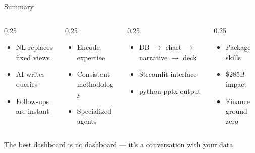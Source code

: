 \documentclass[aspectratio=169]{beamer}
\begin{document}
\begin{frame}{Summary}
\begin{columns}[T]
\begin{column}{0.25\textwidth}
\begin{shadedbox}[title=\textbf{Dashboards}]
\begin{itemize}\scriptsize
  \item NL replaces fixed views
  \item AI writes queries
  \item Follow-ups are instant
\end{itemize}
\end{shadedbox}
\end{column}
\begin{column}{0.25\textwidth}
\begin{shadedbox}[title=\textbf{Skills}]
\begin{itemize}\scriptsize
  \item Encode expertise
  \item Consistent methodology
  \item Specialized agents
\end{itemize}
\end{shadedbox}
\end{column}
\begin{column}{0.25\textwidth}
\begin{shadedbox}[title=\textbf{Pipelines}]
\begin{itemize}\scriptsize
  \item DB $\rightarrow$ chart $\rightarrow$ narrative $\rightarrow$ deck
  \item Streamlit interface
  \item python-pptx output
\end{itemize}
\end{shadedbox}
\end{column}
\begin{column}{0.25\textwidth}
\begin{shadedbox}[title=\textbf{Plugins}]
\begin{itemize}\scriptsize
  \item Package skills
  \item \$285B impact
  \item Finance ground zero
\end{itemize}
\end{shadedbox}
\end{column}
\end{columns}
\vspace{0.5cm}
\begin{center}
\alert{The best dashboard is no dashboard --- it's a conversation with your data.}
\end{center}
\end{frame}
\end{document}
